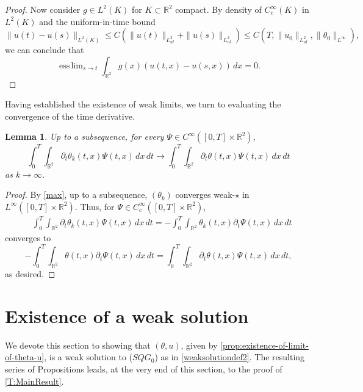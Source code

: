 \documentclass[11pt,reqno,xcolor=svgnames]{amsart}
\def\R{{\mathbb R}}
\theoremstyle{plain}
\newtheorem{lemma}[theorem]{Lemma}
\theoremstyle{definition}
\theoremstyle{plain}
\theoremstyle{remark}
\newcommand{\esslim}{\mathop{\mathrm{ess\,lim}}}
\begin{document}
\begin{proof}
Now consider $g\in L^2(K)$ for $K\subset \R^2$ compact.  By density of $C^{\infty}_c(K)$ in $L^2(K)$ and the uniform-in-time bound
$$ \|u(t) - u(s)\|_{L^2(K)} \leq C(\|u(t)\|_{L^2_{ul}} + \| u(s)\|_{L^2_{ul}}) \leq C(T, \| u_0\|_{L^2_{ul}}, \|\theta_0\|_{L^{\infty}}),$$ 
we can conclude that
$$ \esslim_{s\rightarrow t} \int_{\R^2} g(x) (u(t,x) - u(s,x)) \, dx = 0. $$





\end{proof}

Having established the existence of weak limits, we turn to evaluating the convergence of the time derivative. 
\begin{lemma}\label{timeconvergence}
    Up to a subsequence, for every $\Psi\in C^{\infty}([0,T]\times\R^2)$,
$$ \int_0^T\int_{\R^2} \partial_t \theta_k(t,x) \Psi(t,x) \, dx \, dt \rightarrow \int_0^T\int_{\R^2} \partial_t \theta(t,x) \Psi(t,x) \, dx \, dt$$    as $k\rightarrow \infty$.
\end{lemma}
\begin{proof}
By \cref{max}, up to a subsequence, $(\theta_k)$ converges weak-$\star$ in $L^{\infty} ([0,T]\times \R^2)$.  Thus, for $\Psi\in C^{\infty}_c([0,T] \times \R^2)$, 
\begin{equation*}
\begin{split}
&\int_0^T\int_{\R^2} \partial_t \theta_k(t,x) \Psi(t,x) \, dx \, dt = - \int_0^T\int_{\R^2}  \theta_k(t,x) \partial_t \Psi(t,x) \, dx \, dt  
\end{split}
\end{equation*}
converges to $$ - \int_0^T\int_{\R^2}  \theta(t,x) \partial_t \Psi(t,x) \, dx \, dt = \int_0^T\int_{\R^2}  \partial_t\theta(t,x)  \Psi(t,x) \, dx \, dt,$$
as desired.
\end{proof}


\section{Existence of a weak solution}\label{S:Existence}

\noindent We devote this section to showing that $(\theta,u)$, given by \cref{prop:existence-of-limit-of-theta-u}, is a weak solution to ($SQG_0$) as in \cref{weaksolutiondef2}. The resulting series of Propositions leads, at the very end of this section, to the proof of \cref{T:MainResult}.

\medskip
\end{document}
